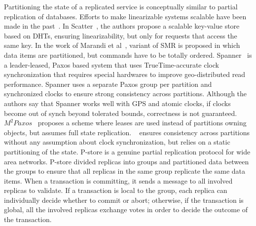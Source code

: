 Partitioning the state of a replicated service is conceptually similar to
partial replication of databases. Efforts to make linearizable systems scalable
have been made in the past~\cite{bezerra2014ssmr, corbett2013spanner,
Glendenning:2011kj, Marandi:2011dj}.  In Scatter~\cite{Glendenning:2011kj}, the
authors propose a scalable key-value store based on DHTs, ensuring
linearizability, but only for requests that access the same key. In the work of
Marandi et al~\cite{Marandi:2011dj}, variant of SMR is proposed in which data
items are partitioned, but commands have to be totally ordered.
Spanner~\cite{corbett2013spanner} is a leader-leased, Paxos based system that
uses TrueTime-accurate clock synchronization that requires special hardwares to
improve geo-distributed read performance. Spanner uses a separate Paxos group
per partition and synchronized clocks to ensure strong consistency across
partitions. Although the authors say that Spanner works well with GPS and atomic
clocks, if clocks become out of synch beyond tolerated bounds, correctness is
not guaranteed. $M^2Paxos$~\cite{7579738} proposes a scheme where leases are
used instead of partitions owning objects, but assumes full state replication.
\ssmr{}~\cite{bezerra2014ssmr} ensures consistency across partitions without any
assumption about clock synchronization, but relies on a static partitioning of
the state. P-store \cite{Schiper:2010pstore} is a genuine partial replication
protocol for wide area networks. P-store divided replicas into groups and
partitioned data between the groups to ensure that all replicas in the same
group replicate the same data items. When a transaction is committing, it sends
a message to all involved replicas to validate. If a transaction is local to the
group, each replica can individually decide whether to commit or abort;
otherwise, if the transaction is global, all the involved replicas exchange
votes in order to decide the outcome of the transaction.



